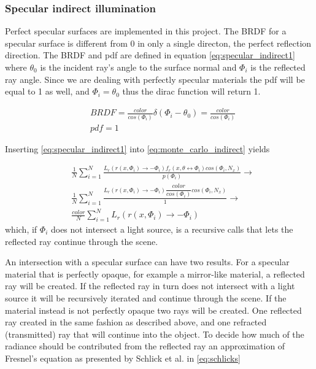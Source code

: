 \documentclass[]{report}   %
\begin{document}
\subsubsection{Specular indirect illumination}
Perfect specular surfaces are implemented in this project.
The BRDF for a specular surface is different from 0 in only a single directon, the perfect reflection direction. 
The BRDF and pdf are defined in equation \autoref{eq:specular_indirect1} where $\theta_0$ is the incident ray's angle to the surface normal and $\Phi_i$ is the reflected ray angle.
Since we are dealing with perfectly specular materials the pdf will be equal to 1 as well, and $\Phi_i = \theta_0$ thus the dirac function will return 1.

\begin{subequations} \label{eq:specular_indirect1}
\begin{align}
	&BRDF = \frac{color}{cos(\Phi_i)}\delta(\Phi_i - \theta_0) = \frac{color}{cos(\Phi_i)} \\
	&pdf = 1
\end{align}
\end{subequations}

Inserting \autoref{eq:specular_indirect1} into \autoref{eq:monte_carlo_indirect} yields

\begin{subequations} \label{eq:specular_indirect2}
\begin{align}
	&\nonumber \frac{1}{N} \sum^{N}_{i=1} \frac{L_r(r(x,\Phi_i) \rightarrow -\Phi_i) f_r(x, \theta \leftrightarrow \Phi_i)cos(\Phi_i, N_x)}{p(\Phi_i)} \rightarrow \\
	&\nonumber \frac{1}{N} \sum^{N}_{i=1} \frac{L_r(r(x,\Phi_i) \rightarrow -\Phi_i) \dfrac{color}{cos(\Phi_i)} cos(\Phi_i, N_x)}{1} \rightarrow \\
	&\frac{color}{N} \sum^{N}_{i=1} L_r(r(x,\Phi_i) \rightarrow -\Phi_i)
\end{align}
\end{subequations}
which, if $\Phi_i$ does not intersect a light source, is a recursive calls that lets the reflected ray continue through the scene.

An intersection with a specular surface can have two results. 
For a specular material that is perfectly opaque, for example a mirror-like material, a reflected ray will be created. 
If the reflected ray in turn does not intersect with a light source it will be recursively iterated and continue through the scene.
If the material instead is not perfectly opaque two rays will be created.
One reflected ray created in the same fashion as described above, and one refracted (transmitted) ray that will continue into the object.
To decide how much of the radiance should be contributed from the reflected ray an approximation of Fresnel's equation as presented by Schlick et al. \cite{schlick} in \autoref{eq:schlicks}
\end{document}
